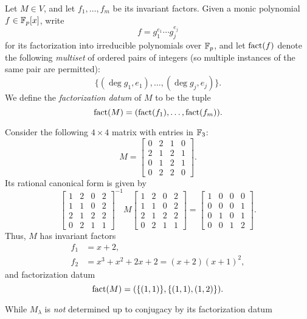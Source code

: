 \begin{defn}
Let $M\in V$, and let $f_1,\ldots,f_m$ be its invariant factors. Given a monic polynomial $f\in\mathbb{F}_p[x]$, write
\begin{equation*}
f=g_1^{e_1}\cdots g_j^{e_j}
\end{equation*}
for its factorization into irreducible polynomials over $\mathbb{F}_p$, and let $\operatorname{fact}(f)$ denote the following \emph{multiset} of ordered pairs of integers (so multiple instances of the same pair are permitted):
\begin{equation*}
\{(\deg g_1,e_1),\ldots,(\deg g_j,e_j)\}.
\end{equation*}
We define the \emph{factorization datum} of $M$ to be the tuple
\begin{equation*}
\operatorname{fact}(M)=(\operatorname{fact}(f_1),\ldots,\operatorname{fact}(f_m)).
\end{equation*}
\end{defn}
\begin{example}
Consider the following $4\times 4$ matrix with entries in $\mathbb{F}_3$:
\begin{equation*}
M=\begin{bmatrix}
0&2&1&0\\
2&1&2&1\\
0&1&2&1\\
0&2&2&0
\end{bmatrix}.
\end{equation*}
Its rational canonical form is given by
\begin{equation*}
\begin{bmatrix}
1&2&0&2\\
1&1&0&2\\
2&1&2&2\\
0&2&1&1
\end{bmatrix}^{-1}
M
\begin{bmatrix}
1&2&0&2\\
1&1&0&2\\
2&1&2&2\\
0&2&1&1
\end{bmatrix}
=
\begin{bmatrix}
1&0&0&0\\
0&0&0&1\\
0&1&0&1\\
0&0&1&2
\end{bmatrix}.
\end{equation*}
Thus, $M$ has invariant factors
\begin{align*}
f_1&=x+2,\\
f_2&=x^3+x^2+2x+2=(x+2)(x+1)^2,
\end{align*}
and factorization datum
\begin{equation*}
\operatorname{fact}(M)=(\{(1,1)\},\{(1,1),(1,2)\}).
\end{equation*}
\end{example}
While $M_\lambda$ is \emph{not} determined up to conjugacy by its factorization datum

